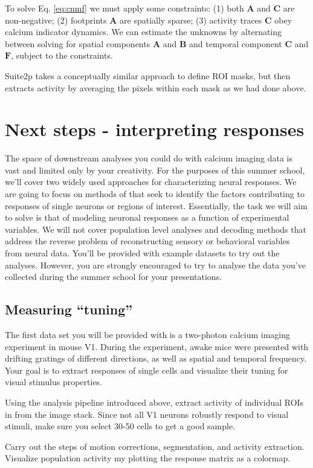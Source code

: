 \documentclass[a4paper]{report}
\newcommand{\nexercise}[0]{\arabic{exercises}\addtocounter{exercises}{1}}
\begin{document}
To solve Eq. \ref{eq:cnmf} we must apply some constraints: (1) both $\mathbf{A}$ and $\mathbf{C}$ are non-negative; (2) footprints $\mathbf{A}$ are spatially sparse; (3) activity traces $\mathbf{C}$ obey calcium indicator dynamics. We can estimate the unknowns by alternating between solving for spatial components $\mathbf{A}$ and $\mathbf{B}$ and temporal component $\mathbf{C}$ and $\mathbf{F}$, subject to the constraints.

Suite2p takes a conceptually similar approach to define ROI masks, but then extracts activity by averaging the pixels within each mask as we had done above.

\section{Next steps - interpreting responses}
The space of downstream analyses you could do with calcium imaging data is vast and limited only by your creativity. 
For the purposes of this summer school, we'll cover two widely used approaches for characterizing neural responses. 
We are going to focus on methods of that seek to identify the factors contributing to responses of single neurons or regions of interest. 
Essentially, the task we will aim to solve is that of modeling neuronal responses as a function of experimental variables. 
We will not cover population level analyses and decoding methods that address the reverse problem of reconstructing sensory or behavioral variables from neural data. 
You'll be provided with example datasets to try out the analyses. However, you are strongly encouraged to try to analyse the data you've collected during the summer school for your presentations.

\subsection{Measuring ``tuning''}
The first data set you will be provided with is a two-photon calcium imaging experiment in mouse V1. 
During the experiment, awake mice were presented with drifting gratings of different directions, as well as spatial and temporal frequency.
Your goal is to extract responses of single cells and visualize their tuning for visual stimulus properties.

\begin{exercisebox}[frametitle={Exercise \nexercise: 2P data pre-processing}]
Using the analysis pipeline introduced above, extract activity of individual ROIs in from the image stack. 
Since not all V1 neurons robustly respond to visual stimuli, make sure you select 30-50 cells to get a good sample.

Carry out the steps of motion corrections, segmentation, and activity extraction.
Visualize population activity my plotting the response matrix as a colormap.
\end{exercisebox}
\end{document}
